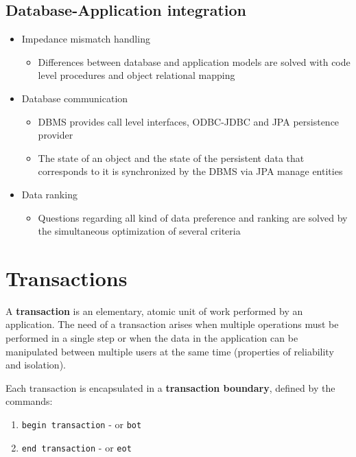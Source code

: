 \documentclass[english]{article}
\begin{document}
\subsection{Database-Application integration}

\begin{itemize}
  \item Impedance mismatch handling
        \begin{itemize}[label=\(\rightarrow\)]
          \item Differences between database and application models are solved with code level procedures and object relational mapping
        \end{itemize}
  \item Database communication
        \begin{itemize}[label=\(\rightarrow\)]
          \item DBMS provides call level interfaces, ODBC-JDBC and JPA persistence provider
          \item The state of an object and the state of the persistent data that corresponds to it is synchronized by the DBMS via JPA manage entities
        \end{itemize}
  \item Data ranking
        \begin{itemize}[label=\(\rightarrow\)]
          \item Questions regarding all kind of data preference and ranking are solved by the simultaneous optimization of several criteria
        \end{itemize}
\end{itemize}

\clearpage

\section{Transactions}

A \textbf{transaction} is an elementary, atomic unit of work performed by an application.
The need of a transaction arises when multiple operations must be performed in a single step or when the data in the application can be manipulated between multiple users at the same time (properties of reliability and isolation).

Each transaction is encapsulated in a \textbf{transaction boundary}, defined by the commands:

\begin{enumerate}
  \item \texttt{begin transaction} - or \texttt{bot}
  \item \texttt{end transaction} -  or \texttt{eot}
\end{enumerate}
\end{document}
